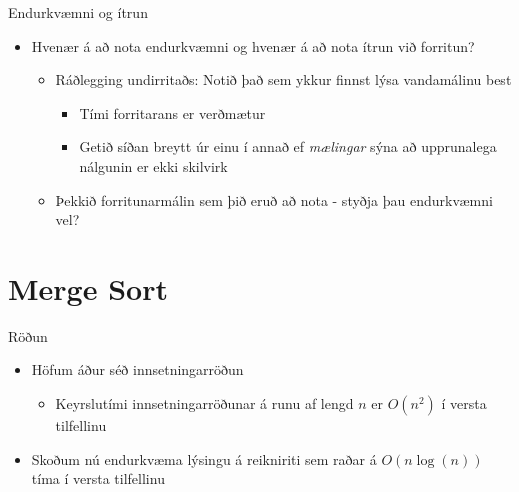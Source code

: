 \documentclass{beamer}
\begin{document}
\begin{frame}{Endurkvæmni og ítrun}
\begin{itemize}
 \item Hvenær á að nota endurkvæmni og hvenær á að nota ítrun við forritun? \pause
 \begin{itemize}
  \item Ráðlegging undirritaðs: Notið það sem ykkur finnst lýsa vandamálinu best
  \begin{itemize}
   \item Tími forritarans er verðmætur
   \item Getið síðan breytt úr einu í annað ef \emph{mælingar} sýna að upprunalega nálgunin er ekki skilvirk
  \end{itemize}
  \item Þekkið forritunarmálin sem þið eruð að nota - styðja þau endurkvæmni vel?
 \end{itemize}
\end{itemize}
\end{frame}

\section{Merge Sort}

\begin{frame}{Röðun}
\begin{itemize}
 \item Höfum áður séð innsetningarröðun
 \begin{itemize}
  \item Keyrslutími innsetningarröðunar á runu af lengd $n$ er $O(n^2)$ í versta tilfellinu
 \end{itemize}
 \item Skoðum nú endurkvæma lýsingu á reikniriti sem raðar á $O(n\log(n))$ tíma í versta tilfellinu
\end{itemize}
\end{frame}
\end{document}
